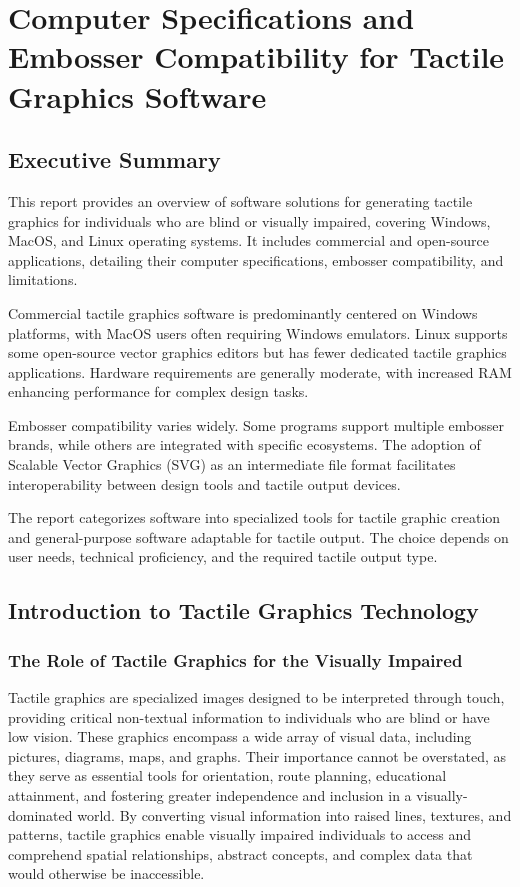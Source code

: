 \chapter{Computer Specifications and Embosser Compatibility for Tactile Graphics Software}

\section{Executive Summary}

This report provides an overview of software solutions for generating tactile graphics for individuals who are blind or visually impaired, covering Windows, MacOS, and Linux operating systems. It includes commercial and open-source applications, detailing their computer specifications, embosser compatibility, and limitations.

Commercial tactile graphics software is predominantly centered on Windows platforms, with MacOS users often requiring Windows emulators. Linux supports some open-source vector graphics editors but has fewer dedicated tactile graphics applications. Hardware requirements are generally moderate, with increased RAM enhancing performance for complex design tasks.

Embosser compatibility varies widely. Some programs support multiple embosser brands, while others are integrated with specific ecosystems. The adoption of Scalable Vector Graphics (SVG) as an intermediate file format facilitates interoperability between design tools and tactile output devices.

The report categorizes software into specialized tools for tactile graphic creation and general-purpose software adaptable for tactile output. The choice depends on user needs, technical proficiency, and the required tactile output type.

\section{Introduction to Tactile Graphics Technology}

\subsection{The Role of Tactile Graphics for the Visually Impaired}

Tactile graphics are specialized images designed to be interpreted through touch, providing critical non-textual information to individuals who are blind or have low vision. These graphics encompass a wide array of visual data, including pictures, diagrams, maps, and graphs. Their importance cannot be overstated, as they serve as essential tools for orientation, route planning, educational attainment, and fostering greater independence and inclusion in a visually-dominated world. By converting visual information into raised lines, textures, and patterns, tactile graphics enable visually impaired individuals to access and comprehend spatial relationships, abstract concepts, and complex data that would otherwise be inaccessible.\cite{Perkins,TactileView,NYUMaps,TouchMapper,AELData}

